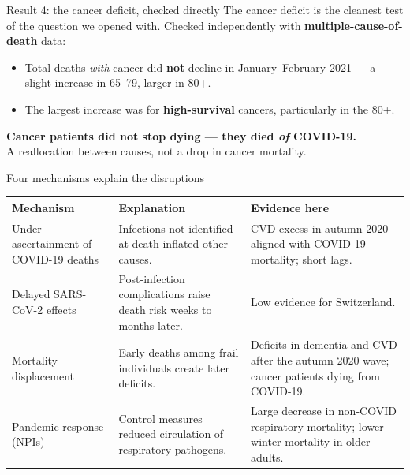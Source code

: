 \documentclass[aspectratio=169,10pt]{beamer}
\newcommand{\compresslist}{%
  \setlength{\itemsep}{3pt}%
  \setlength{\parskip}{0pt}%
  \setlength{\parsep}{0pt}%
}
\newcommand{\punch}[1]{{\color{headerfontcol}\bfseries #1}}
\begin{document}
\begin{frame}{Result 4: the cancer deficit, checked directly}
  \vfill
  The cancer deficit is the cleanest test of the question we opened with.
  Checked independently with \textbf{multiple-cause-of-death} data:
  \begin{itemize}\compresslist
    \item Total deaths \emph{with} cancer did \textbf{not} decline in
          January--February 2021 --- a slight increase in 65--79, larger in 80+.
    \item The largest increase was for \textbf{high-survival} cancers,
          particularly in the 80+.
  \end{itemize}
  \vfill
  \begin{center}
    \punch{Cancer patients did not stop dying --- they died \emph{of} COVID-19.}\\[0.3em]
    A reallocation between causes, not a drop in cancer mortality.
  \end{center}
  \vfill
\end{frame}

\begin{frame}{Four mechanisms explain the disruptions}
  \centering
  {\scriptsize
  \begin{tabular}{p{2.4cm} p{4.2cm} p{5.2cm}}
    \toprule
    \textbf{Mechanism} & \textbf{Explanation} & \textbf{Evidence here} \\
    \midrule
    \raggedright Under-ascertainment of COVID-19 deaths &
      Infections not identified at death inflated other causes. &
      CVD excess in autumn 2020 aligned with COVID-19 mortality; short lags. \\
    \midrule
    \raggedright Delayed SARS-CoV-2 effects &
      Post-infection complications raise death risk weeks to months later. &
      Low evidence for Switzerland. \\
    \midrule
    \raggedright Mortality displacement &
      Early deaths among frail individuals create later deficits. &
      Deficits in dementia and CVD after the autumn 2020 wave; cancer patients
      dying from COVID-19. \\
    \midrule
    \raggedright Pandemic response (NPIs) &
      Control measures reduced circulation of respiratory pathogens. &
      Large decrease in non-COVID respiratory mortality; lower winter mortality
      in older adults. \\
    \bottomrule
  \end{tabular}}
\end{frame}
\end{document}
